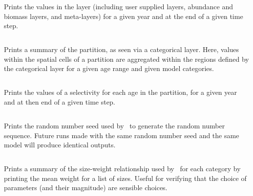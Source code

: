 Prints the values in the layer (including user supplied layers, abundance and biomass layers, and meta-layers) for a given year and at the end of a given time step. 

\subsection{}

Prints a summary of the partition, as seen via a categorical layer. Here, values within the spatial cells of a partition are aggregated within the regions defined by the categorical layer for a given age range and given model categories.

\subsection{}

Prints the values of a selectivity for each age in the partition, for a given year and at then end of a given time step.

\subsection{}

Prints the random number seed used by \SPM\ to generate the random number sequence. Future runs made with the same random number seed and the same model will produce identical outputs.

\subsection{\label{sec:report-weight-at-size}}

Prints a summary of the size-weight relationship used by \SPM\ for each category by printing the mean weight for a list of sizes. Useful for verifying that the choice of parameters (and their magnitude) are sensible choices.

